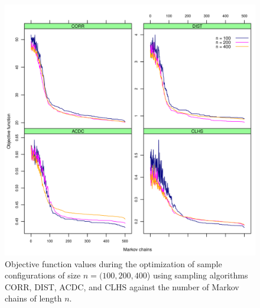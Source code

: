 \begin{figure}[!ht]
 \centering
 \includegraphics[width=\textwidth]{fig/chap07-energy_corr_dist_acdc_clhs}
 \caption[Objective function values during the optimization of three sample configurations using four sampling 
 algorithms.]{Objective function values during the optimization of sample configurations of size 
 $n = (100, 200, 400$) using sampling algorithms CORR, DIST, ACDC, and CLHS against the number of Markov 
 chains of length $n$.}
 \label{fig:chap07-energy-all}
\end{figure}

